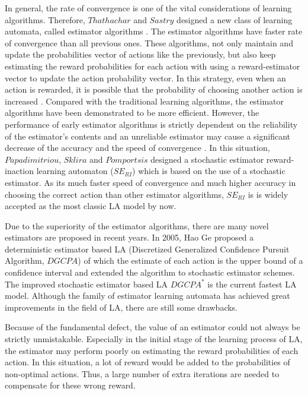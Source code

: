 In general, the rate of convergence is one of the vital considerations of learning algorithms. Therefore, $Thathachar$ and $Sastry$ designed a new class of learning automata, called estimator algorithms \cite{thathachar1985new}\cite{thathachar1986estimator}. The estimator algorithms have faster rate of convergence than all previous ones. These algorithms, not only maintain and update the probabilities vector of actions like the previously, but also keep estimating the reward probabilities for each action with using a reward-estimator vector to update the action probability vector. In this strategy, even when an action is rewarded, it is possible that the probability of choosing another action is increased \cite{papadimitriou2004new}. Compared with the traditional learning algorithms, the estimator algorithms have been demonstrated to be more efficient. However, the performance of early estimator algorithms is strictly dependent on the reliability of the estimator’s contents and an unreliable estimator may cause a significant decrease of the accuracy and the speed of convergence \cite{papadimitriou2004new}. In this situation, $Papadimitriou$, $Sklira$ and $Pomportsis$ \cite{papadimitriou2004new} designed a stochastic estimator reward-inaction learning automaton ($SE_{RI}$) which is based on the use of a stochastic estimator. As its much faster speed of convergence and much higher accuracy in choosing the correct action than other estimator algorithms, $SE_{RI}$ is is widely accepted as the most classic LA model by now.

Due to the superiority of the estimator algorithms, there are many novel estimators \cite{ge2015novel}\cite{jiang2011new}\cite{jiang2016new} are proposed in recent years. In 2005, Hao Ge \cite{ge2015novel} proposed a deterministic estimator based LA (Discretized Generalized Confidence Pursuit Algorithm, $DGCPA$) of which the estimate of each action is the upper bound of a confidence interval and extended the algorithm to stochastic estimator schemes. The improved stochastic estimator based LA $DGCPA^{*}$ is the current fastest LA model. Although the family of estimator learning automata has achieved great improvements in the field of LA, there are still some drawbacks.

Because of the fundamental defect, the value of an estimator could not always be strictly unmistakable. Especially in the initial stage of the learning process of LA, the estimator may perform poorly on estimating the reward probabilities of each action. In this situation, a lot of reward would be added to the probabilities of non-optimal actions. Thus, a large number of extra iterations are needed to compensate for these wrong reward.


